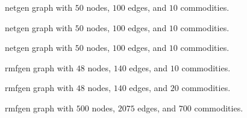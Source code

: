 \begin{figure}
\begin{center}
\mbox{}
\end{center}
\figinfo
\caption{{\sc netgen} graph with
$50$ nodes, $100$ edges, and $10$ commodities. }
\label{fig:p2}
\end{figure}

\begin{figure}
\begin{center}
\mbox{}
\end{center}
\figinfo
\caption{{\sc netgen} graph with
$50$ nodes, $100$ edges, and $10$ commodities. }
\label{fig:p3}
\end{figure}

\begin{figure}
\begin{center}
\mbox{}
\end{center}
\figinfo
\caption{{\sc netgen} graph with
$50$ nodes, $100$ edges, and $10$ commodities. }
\label{fig:p4}
\end{figure}

\begin{figure}
\begin{center}
\mbox{}
\end{center}
\figinfo
\caption{{\sc rmfgen} graph with
$48$ nodes, $140$ edges, and $10$ commodities. }
\label{fig:p5}
\end{figure}

\begin{figure}
\begin{center}
\mbox{}
\end{center}
\figinfo
\caption{ {\sc rmfgen} graph with
$48$ nodes, $140$ edges, and $20$ commodities. }
\label{fig:p6}
\end{figure}

\begin{figure}
\begin{center}
\mbox{}
\end{center}
\figinfo
\caption{ {\sc rmfgen} graph with
$500$ nodes, $2075$ edges, and $700$ commodities. }
\label{fig:p7}
\end{figure}

